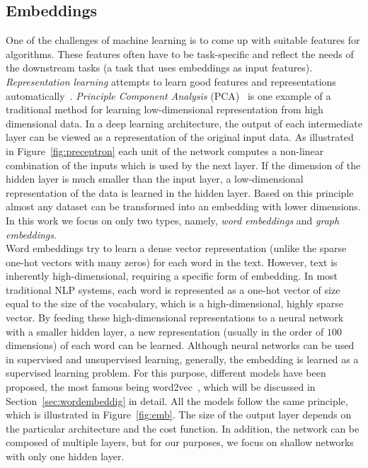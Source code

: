 \subsection{Embeddings}\label{subsec:embeddings}
One of the challenges of machine learning is to come up with suitable features for algorithms. These features often have to be task-specific and reflect the needs of the downstream tasks (a task that uses embeddings as input features). \emph{Representation learning} attempts to learn good features and representations automatically~. \emph{Principle Component Analysis} (PCA)~ is one example of a traditional method for learning low-dimensional representation from high dimensional data. In a deep learning architecture, the output of each intermediate layer can be viewed as a representation of the original input data. As illustrated in Figure~\ref{fig:preceptron} each unit of the network computes a non-linear combination of the inputs which is used by the next layer. If the dimension of the hidden layer is much smaller than the input layer, a low-dimensional representation of the data is learned in the hidden layer. Based on this principle almost any dataset can be transformed into an embedding with lower dimensions. In this work we focus on only two types, namely, \emph{word embeddings} and \emph{graph embeddings}. \\
\noindent
Word embeddings try to learn a dense vector representation (unlike the sparse one-hot vectors with many zeros) for each word in the text.
However, text is inherently high-dimensional, requiring a specific form of embedding.
In most traditional NLP systems, each word is represented as a one-hot vector of size equal to the size of the vocabulary, which is a high-dimensional, highly sparse vector.
By feeding these high-dimensional representations to a neural network with a smaller hidden layer, a new representation (usually in the order of $100$ dimensions) of each word can be learned. Although neural networks can be used in supervised and unsupervised learning, generally, the embedding is learned as a supervised learning problem. For this purpose, different models have been proposed, the most famous being word2vec~, which will be discussed in Section~\ref{sec:wordembeddig} in detail. All the models follow the same principle, which is illustrated in Figure~\ref{fig:emb}. The size of the output layer depends on the particular architecture and the cost function. In addition, the network can be composed of multiple layers, but for our purposes, we focus on shallow networks with only one hidden layer. \\
